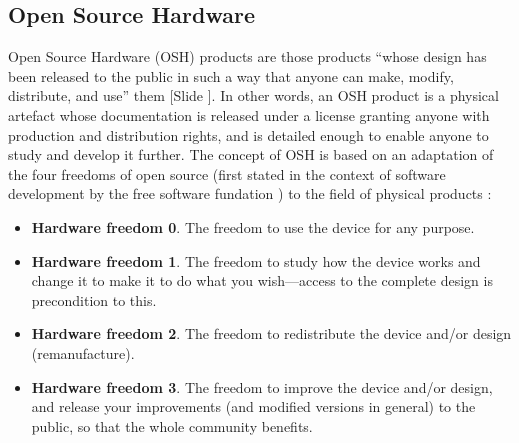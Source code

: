 \documentclass{article}
\newcounter{slide}
\begin{document}
\subsection{Open Source Hardware}
\label{sec:OSH}
Open Source Hardware (OSH) products are those products ``whose design has been released to the public in such a way that anyone can make, modify, distribute, and use'' them \cite{opensourcehardwareassociationOpenSourceHardware2016} {\color{blue}[Slide ]}. In other words, an OSH product is a physical artefact whose documentation is released under a license granting anyone with production and distribution rights, and is detailed enough to enable anyone to study and develop it further. The concept of OSH is based on an adaptation of the four freedoms of open source (first stated in the context of software development by the free software fundation \cite{freesoftwarefoundationFreeSoftwareDefinition2015}) to the field of physical products \cite{powellDemocratizingProductionOpen2012}: 
\begin{itemize}
	\item \textbf{Hardware freedom 0}. The freedom to use the device for any purpose.
	\item \textbf{Hardware freedom 1}. The freedom to study how the device works and change it to make it to do what you wish---access to the complete design is precondition to this.
	\item \textbf{Hardware freedom 2}. The freedom to redistribute the device and/or design (remanufacture).
	\item \textbf{Hardware freedom 3}. The freedom to improve the device and/or design, and release your improvements (and modified versions in general) to the public, so that the whole community benefits.
\end{itemize}
\end{document}
